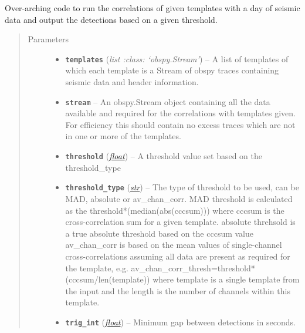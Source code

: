 \documentclass[a4paper,10pt,english]{sphinxmanual}
\begin{document}
\begin{fulllineitems}
\label{core:match_filter.match_filter}
Over-arching code to run the correlations of given templates with a day of
seismic data and output the detections based on a given threshold.
\begin{quote}\begin{description}
\item[{Parameters}] \leavevmode\begin{itemize}
\item {} 
\textbf{\texttt{templates}} (\emph{list :class: `obspy.Stream'}) -- A list of templates of which each template is a Stream of        obspy traces containing seismic data and header information.

\item {} 
\textbf{\texttt{stream}} -- An obspy.Stream object containing all the data available and        required for the correlations with templates given.  For efficiency this        should contain no excess traces which are not in one or more of the        templates.

\item {} 
\textbf{\texttt{threshold}} (\href{https://docs.python.org/library/functions.html\#float}{\emph{float}}) -- A threshold value set based on the threshold\_type

\item {} 
\textbf{\texttt{threshold\_type}} (\href{https://docs.python.org/library/functions.html\#str}{\emph{str}}) -- The type of threshold to be used, can be MAD,        absolute or av\_chan\_corr.    MAD threshold is calculated as the        threshold*(median(abs(cccsum))) where cccsum is the cross-correlation        sum for a given template. absolute threhsold is a true absolute        threshold based on the cccsum value av\_chan\_corr is based on the mean        values of single-channel cross-correlations assuming all data are        present as required for the template,         e.g. av\_chan\_corr\_thresh=threshold*(cccsum/len(template)) where        template is a single template from the input and the length is the        number of channels within this template.

\item {} 
\textbf{\texttt{trig\_int}} (\href{https://docs.python.org/library/functions.html\#float}{\emph{float}}) -- Minimum gap between detections in seconds.


\end{itemize}
\end{description}
\end{quote}
\end{fulllineitems}
\end{document}
